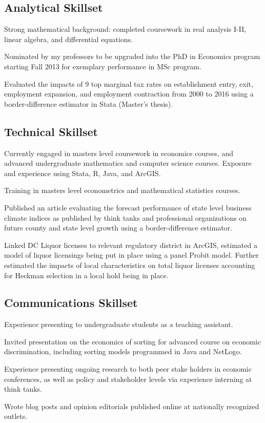 \documentclass[letterpaper]{article}
\renewenvironment{itemize}{
  \begin{list}{}{
    \setlength{\leftmargin}{0em}
  }
}{
  \end{list}
}
\begin{document}
\subsection*{Analytical Skillset}
\begin{itemize}
\item Strong mathematical background: completed coursework in real analysis I-II, linear algebra, and differential equations. 
\item Nominated by my professors to be upgraded into the PhD in Economics program starting Fall 2013 for exemplary performance in MSc program.
\item Evaluated the impacts of 9 top marginal tax rates on establishment entry, exit, employment expansion, and employment contraction from 2000 to 2016 using a border-difference estimator in Stata (Master's thesis).
\end{itemize}
\subsection*{Technical Skillset}
\begin{itemize}
\item Currently engaged in masters level coursework in economics courses, and advanced undergraduate mathematics and computer science courses. Exposure and experience using Stata, R, Java, and ArcGIS. 
\item Training in masters level econometrics and mathematical statistics courses.
\item Published an article evaluating the forecast performance of state level business climate indices as published by think tanks and professional organizations on future county and state level growth using a border-difference estimator.
\item Linked DC Liquor licenses to relevant regulatory district in ArcGIS, estimated a model of liquor licensings being put in place using a panel Probit model. Further estimated the impacts of local characteristics on total liquor licenses accounting for Heckman selection in a local hold being in place.
\end{itemize}
\subsection*{Communications Skillset}
\begin{itemize}
\item Experience presenting to undergraduate students as a teaching assistant.
\item Invited presentation on the economics of sorting for advanced course on economic discrimination, including sorting models programmed in Java and NetLogo.
\item Experience presenting ongoing research to both peer stake holders in economic conferences, as well as policy and stakeholder levels via experience interning at think tanks.
\item Wrote blog posts and opinion editorials published online at nationally recognized outlets.
\end{itemize}
\end{document}
